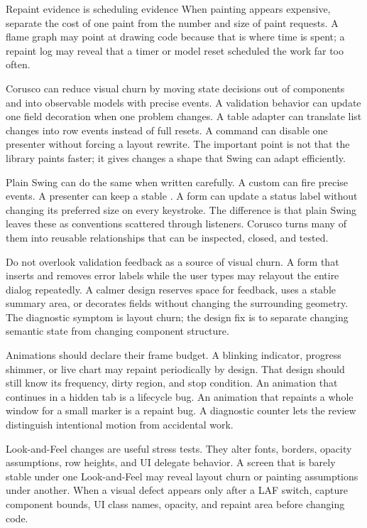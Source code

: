 \begin{detailbox}{Repaint evidence is scheduling evidence}
When painting appears expensive, separate the cost of one paint from the number and size of paint requests. A flame graph may point at drawing code because that is where time is spent; a repaint log may reveal that a timer or model reset scheduled the work far too often.
\end{detailbox}

Corusco can reduce visual churn by moving state decisions out of components and into observable models with precise events. A validation behavior can update one field decoration when one problem changes. A table adapter can translate list changes into row events instead of full resets. A command can disable one presenter without forcing a layout rewrite. The important point is not that the library paints faster; it gives changes a shape that Swing can adapt efficiently.

Plain Swing can do the same when written carefully. A custom  can fire precise events. A presenter can keep a stable . A form can update a status label without changing its preferred size on every keystroke. The difference is that plain Swing leaves these as conventions scattered through listeners. Corusco turns many of them into reusable relationships that can be inspected, closed, and tested.

Do not overlook validation feedback as a source of visual churn. A form that inserts and removes error labels while the user types may relayout the entire dialog repeatedly. A calmer design reserves space for feedback, uses a stable summary area, or decorates fields without changing the surrounding geometry. The diagnostic symptom is layout churn; the design fix is to separate changing semantic state from changing component structure.

Animations should declare their frame budget. A blinking indicator, progress shimmer, or live chart may repaint periodically by design. That design should still know its frequency, dirty region, and stop condition. An animation that continues in a hidden tab is a lifecycle bug. An animation that repaints a whole window for a small marker is a repaint bug. A diagnostic counter lets the review distinguish intentional motion from accidental work.

Look-and-Feel changes are useful stress tests. They alter fonts, borders, opacity assumptions, row heights, and UI delegate behavior. A screen that is barely stable under one Look-and-Feel may reveal layout churn or painting assumptions under another. When a visual defect appears only after a LAF switch, capture component bounds, UI class names, opacity, and repaint area before changing code.


